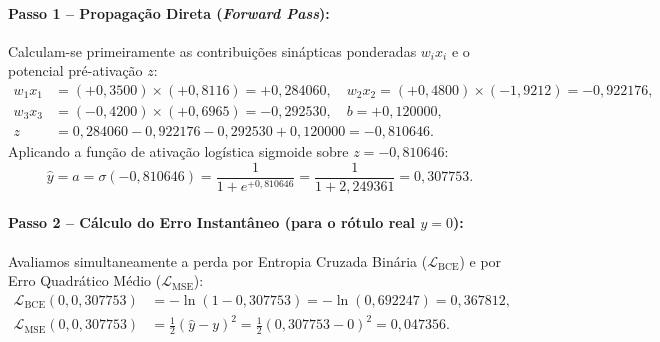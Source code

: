 \documentclass[runningheads]{llncs}
\begin{document}
\paragraph{Passo 1 -- Propaga\c{c}\~{a}o Direta (\textit{Forward Pass}):}
Calculam-se primeiramente as contribui\c{c}\~{o}es sin\'{a}pticas ponderadas $w_i x_i$ e o potencial pr\'{e}-ativa\c{c}\~{a}o $z$:
\begin{align}
    w_1 x_1 &= (+0{,}3500) \times (+0{,}8116) = +0{,}284060, \quad w_2 x_2 = (+0{,}4800) \times (-1{,}9212) = -0{,}922176, \nonumber\\
    w_3 x_3 &= (-0{,}4200) \times (+0{,}6965) = -0{,}292530, \quad b = +0{,}120000, \nonumber\\
    z &= 0{,}284060 - 0{,}922176 - 0{,}292530 + 0{,}120000 = -0{,}810646.
\end{align}
Aplicando a fun\c{c}\~{a}o de ativa\c{c}\~{a}o log\'{i}stica sigmoide sobre $z = -0{,}810646$:
\begin{equation}
    \hat{y} = a = \sigma(-0{,}810646) = \frac{1}{1 + e^{+0{,}810646}} = \frac{1}{1 + 2{,}249361} = 0{,}307753.
\end{equation}

\paragraph{Passo 2 -- C\'{a}lculo do Erro Instant\^{a}neo (para o r\'{o}tulo real $y = 0$):}
Avaliamos simultaneamente a perda por Entropia Cruzada Bin\'{a}ria ($\mathcal{L}_{\text{BCE}}$) e por Erro Quadr\'{a}tico M\'{e}dio ($\mathcal{L}_{\text{MSE}}$):
\begin{align}
    \mathcal{L}_{\text{BCE}}(0, 0{,}307753) &= -\ln(1 - 0{,}307753) = -\ln(0{,}692247) = 0{,}367812, \\
    \mathcal{L}_{\text{MSE}}(0, 0{,}307753) &= \frac{1}{2}(\hat{y} - y)^2 = \frac{1}{2}(0{,}307753 - 0)^2 = 0{,}047356.
\end{align}
\end{document}

